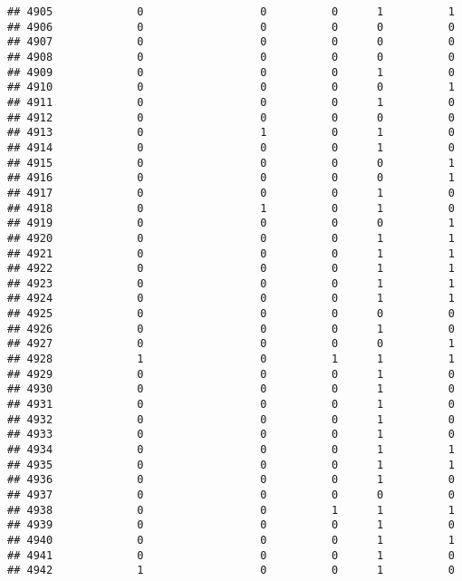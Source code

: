 \documentclass[
]{article}
\begin{document}
\begin{verbatim}
## 4905             0                  0          0      1          1
## 4906             0                  0          0      0          0
## 4907             0                  0          0      0          0
## 4908             0                  0          0      0          0
## 4909             0                  0          0      1          0
## 4910             0                  0          0      0          1
## 4911             0                  0          0      1          0
## 4912             0                  0          0      0          0
## 4913             0                  1          0      1          0
## 4914             0                  0          0      1          0
## 4915             0                  0          0      0          1
## 4916             0                  0          0      0          1
## 4917             0                  0          0      1          0
## 4918             0                  1          0      1          0
## 4919             0                  0          0      0          1
## 4920             0                  0          0      1          1
## 4921             0                  0          0      1          1
## 4922             0                  0          0      1          1
## 4923             0                  0          0      1          1
## 4924             0                  0          0      1          1
## 4925             0                  0          0      0          0
## 4926             0                  0          0      1          0
## 4927             0                  0          0      0          1
## 4928             1                  0          1      1          1
## 4929             0                  0          0      1          0
## 4930             0                  0          0      1          0
## 4931             0                  0          0      1          0
## 4932             0                  0          0      1          0
## 4933             0                  0          0      1          0
## 4934             0                  0          0      1          1
## 4935             0                  0          0      1          1
## 4936             0                  0          0      1          0
## 4937             0                  0          0      0          0
## 4938             0                  0          1      1          1
## 4939             0                  0          0      1          0
## 4940             0                  0          0      1          1
## 4941             0                  0          0      1          0
## 4942             1                  0          0      1          0

\end{verbatim}
\end{document}
